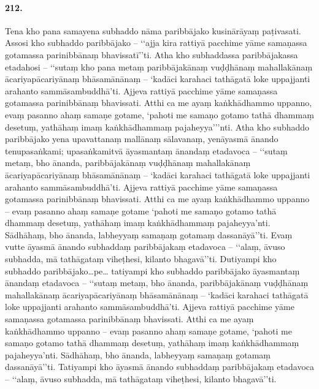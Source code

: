 \paragraph{212.} Tena kho pana samayena subhaddo nāma paribbājako kusinārāyaṃ paṭivasati. Assosi kho subhaddo paribbājako – ‘‘ajja kira rattiyā pacchime yāme samaṇassa gotamassa parinibbānaṃ bhavissatī’’ti. Atha kho subhaddassa paribbājakassa etadahosi – ‘‘sutaṃ kho pana metaṃ paribbājakānaṃ vuḍḍhānaṃ mahallakānaṃ ācariyapācariyānaṃ bhāsamānānaṃ – ‘kadāci karahaci tathāgatā loke uppajjanti arahanto sammāsambuddhā’ti. Ajjeva rattiyā pacchime yāme samaṇassa gotamassa parinibbānaṃ bhavissati. Atthi ca me ayaṃ kaṅkhādhammo uppanno, evaṃ pasanno ahaṃ samaṇe gotame, ‘pahoti me samaṇo gotamo tathā dhammaṃ desetuṃ, yathāhaṃ imaṃ kaṅkhādhammaṃ pajaheyya’’’nti. Atha kho subhaddo paribbājako yena upavattanaṃ mallānaṃ sālavanaṃ, yenāyasmā ānando tenupasaṅkami; upasaṅkamitvā āyasmantaṃ ānandaṃ etadavoca – ‘‘sutaṃ metaṃ, bho ānanda, paribbājakānaṃ vuḍḍhānaṃ mahallakānaṃ ācariyapācariyānaṃ bhāsamānānaṃ – ‘kadāci karahaci tathāgatā loke uppajjanti arahanto sammāsambuddhā’ti. Ajjeva rattiyā pacchime yāme samaṇassa gotamassa parinibbānaṃ bhavissati. Atthi ca me ayaṃ kaṅkhādhammo uppanno – evaṃ pasanno ahaṃ samaṇe gotame ‘pahoti me samaṇo gotamo tathā dhammaṃ desetuṃ, yathāhaṃ imaṃ kaṅkhādhammaṃ pajaheyya’nti. Sādhāhaṃ, bho ānanda, labheyyaṃ samaṇaṃ gotamaṃ dassanāyā’’ti. Evaṃ vutte āyasmā ānando subhaddaṃ paribbājakaṃ etadavoca – ‘‘alaṃ, āvuso subhadda, mā tathāgataṃ viheṭhesi, kilanto bhagavā’’ti. Dutiyampi kho subhaddo paribbājako…pe… tatiyampi kho subhaddo paribbājako āyasmantaṃ ānandaṃ etadavoca – ‘‘sutaṃ metaṃ, bho ānanda, paribbājakānaṃ vuḍḍhānaṃ mahallakānaṃ ācariyapācariyānaṃ bhāsamānānaṃ – ‘kadāci karahaci tathāgatā loke uppajjanti arahanto sammāsambuddhā’ti. Ajjeva rattiyā pacchime yāme samaṇassa gotamassa parinibbānaṃ bhavissati. Atthi ca me ayaṃ kaṅkhādhammo uppanno – evaṃ pasanno ahaṃ samaṇe gotame, ‘pahoti me samaṇo gotamo tathā dhammaṃ desetuṃ, yathāhaṃ imaṃ kaṅkhādhammaṃ pajaheyya’nti. Sādhāhaṃ, bho ānanda, labheyyaṃ samaṇaṃ gotamaṃ dassanāyā’’ti. Tatiyampi kho āyasmā ānando subhaddaṃ paribbājakaṃ etadavoca – ‘‘alaṃ, āvuso subhadda, mā tathāgataṃ viheṭhesi, kilanto bhagavā’’ti.

